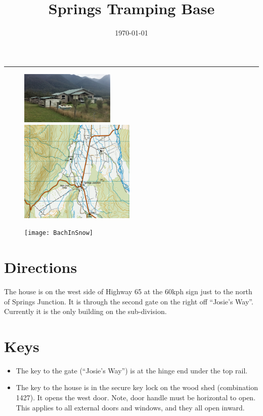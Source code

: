 \documentclass[12pt]{article} %
\title{Springs Tramping Base}
\date{\today} %
\makeatletter
\renewcommand{\maketitle}{%
  \begin{center}
    {\bfseries{\scshape{\Large{\@title\par}}}}
  \end{center}
  \medskip
  \begin{flushright}
    {\@date\par}
  \end{flushright}
    \bigskip\hrule\vspace*{2pc}%
}
\makeatother
\begin{document}
  \maketitle

\begin{figure}[t]
\begin{minipage}{.3\linewidth}
\begin{flushleft} 
   \includegraphics[width=4.5cm]{BachPhoto}
\end{flushleft} 
\end{minipage}
\begin{minipage}{.3\linewidth}
\begin{center} 
   \includegraphics[width=5.5cm]{BachLocation}
\end{center} 
\end{minipage}
\hspace{.05\linewidth}
\begin{minipage}{.3\linewidth}
\begin{flushright} 
    \texttt{[image: BachInSnow]}
\end{flushright} 
\end{minipage}
\end{figure}

  \section{Directions}
    The house is on the west side of Highway 65 at the 60kph sign just
    to the north of Springs Junction.  It is through the second gate on the
    right off ``Josie's Way''.  Currently it is the only building on
    the sub-division.

  \section{Keys}
  \begin{itemize}
    \item The key to the gate (``Josie's Way'') is at the hinge end under
    the top rail.
    \item The key to the house is in the secure key lock on the wood shed (combination 1427).  It opens the west door.  Note,
    door handle must be horizontal to open.  This applies to all external doors and windows, and they all open inward.
  \end{itemize}
\end{document}
